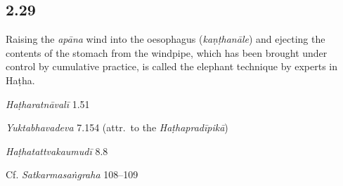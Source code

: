 \begin{ekdosis}
\subsection*{2.29}
\begin{translation}[hp02_029]
Raising the \emph{apāna} wind into the oesophagus (\emph{kaṇṭhanāle}) and ejecting the contents of the stomach from the windpipe, which has been brought under control by cumulative practice, is called the elephant technique by experts in Haṭha.
\end{translation}

\begin{sources}[hp02_029]
\end{sources}

\begin{testimonia}[hp02_029]
\emph{Haṭharatnāvalī} 1.51

\begin{versinnote}
\end{versinnote}

\emph{Yuktabhavadeva} 7.154 (attr.~to the \emph{Haṭhapradīpikā})

\begin{versinnote}
\end{versinnote}

\emph{Haṭhatattvakaumudī} 8.8

\begin{versinnote}
\end{versinnote}

Cf. \emph{Satkarmasaṅgraha} 108–109


\end{testimonia}
\end{ekdosis}

